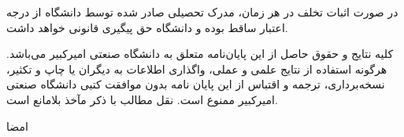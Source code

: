 در صورت اثبات تخلف در هر زمان، مدرک تحصیلی صادر شده توسط دانشگاه از درجه اعتبار ساقط بوده و دانشگاه حق پیگیری قانونی خواهد داشت.


کلیه نتایج و حقوق حاصل از این پایان‌نامه متعلق به دانشگاه صنعتی امیرکبیر می‌باشد. هرگونه استفاده از نتایج علمی و عملی، واگذاری اطلاعات به دیگران یا چاپ و تکثیر، نسخه‌برداری، ترجمه و اقتباس از این پایان نامه بدون موافقت کتبی دانشگاه صنعتی امیرکبیر ممنوع است. 
نقل مطالب با ذکر مآخذ بلامانع است.\\
\vspace{2.5cm}


{\centerline {\bf{\fname\lname}}}
\vspace*{.2cm}
{\centerline{امضا}}
